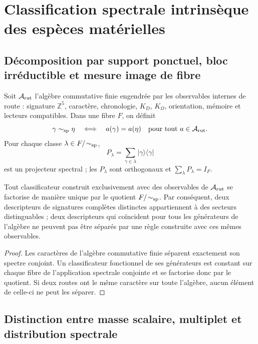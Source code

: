\section{Classification spectrale intrinsèque des espèces matérielles}

\subsection{Décomposition par support ponctuel, bloc irréductible et mesure image de fibre}

Soit \(\mathcal A_{\rm rut}\) l'algèbre commutative finie engendrée par les
observables internes de route : signature \(\mathbb Z^5\), caractère, chronologie,
\(K_D\), \(K_\Omega\), orientation, mémoire et lecteurs compatibles. Dans une
fibre \(F\), on définit
\[
 \gamma\sim_{\rm sp}\eta
 \quad\Longleftrightarrow\quad
 a(\gamma)=a(\eta)\quad\text{pour tout }a\in\mathcal A_{\rm rut}.
\]
Pour chaque classe \(\lambda\in F/\!\sim_{\rm sp}\),
\[
 P_\lambda=\sum_{\gamma\in\lambda}
 |\gamma\rangle\langle\gamma|
\]
est un projecteur spectral ; les \(P_\lambda\) sont orthogonaux et
\(\sum_\lambda P_\lambda=I_F\).

\begin{theorem}
Tout classificateur construit exclusivement avec des observables de
\(\mathcal A_{\rm rut}\) se factorise de manière unique par le quotient
\(F/\!\sim_{\rm sp}\). Par conséquent, deux descripteurs de signatures complètes
distinctes appartiennent à des secteurs distinguables ; deux descripteurs qui coïncident
pour tous les générateurs de l'algèbre ne peuvent pas être séparés par une règle
construite avec ces mêmes observables.
\end{theorem}

\begin{proof}
Les caractères de l'algèbre commutative finie séparent exactement son
spectre conjoint. Un classificateur fonctionnel de ses générateurs est constant
sur chaque fibre de l'application spectrale conjointe et se factorise donc par le
quotient. Si deux routes ont le même caractère sur toute l'algèbre, aucun
élément de celle-ci ne peut les séparer.
\end{proof}

\subsection{Distinction entre masse scalaire, multiplet et distribution spectrale}

